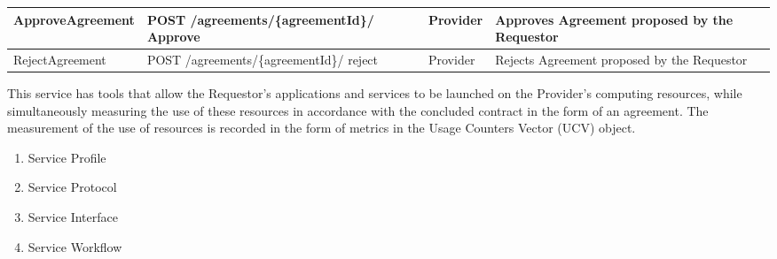 \begin{enumerate}
\begin{enumerate}
\begin{table}
\begin{center}
\begin{tabular}{|p{3cm}|p{7cm}|p{1.5cm}|p{4cm}|}
ApproveAgreement	& POST /agreements/\{agreementId\}/ \newline Approve			& Provider	&	Approves Agreement proposed by the Requestor \\
\hline

RejectAgreement		& POST /agreements/\{agreementId\}/ \newline reject				& Provider	&	Rejects Agreement proposed by the Requestor	\\
\hline

\end{tabular}
\end{center}

\end{table}

\end{enumerate}




\end{enumerate}



This service has tools that allow the Requestor's applications and services to be launched on the Provider's computing resources,
while simultaneously measuring the use of these resources in accordance with the concluded contract in the form of an agreement. 
The measurement of the use of resources is recorded in the form of metrics in the Usage Counters Vector (UCV) object.


\begin{enumerate}
    \item Service Profile
    \item Service Protocol
    \item Service Interface
    \item Service Workflow
\end{enumerate}


